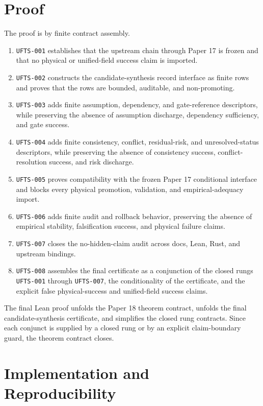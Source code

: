\documentclass{article}
\begin{document}
\section{Proof}

The proof is by finite contract assembly.

\begin{enumerate}
\item \texttt{UFTS-001} establishes that the upstream chain through Paper 17 is
frozen and that no physical or unified-field success claim is imported.
\item \texttt{UFTS-002} constructs the candidate-synthesis record interface as
finite rows and proves that the rows are bounded, auditable, and
non-promoting.
\item \texttt{UFTS-003} adds finite assumption, dependency, and gate-reference
descriptors, while preserving the absence of assumption discharge, dependency
sufficiency, and gate success.
\item \texttt{UFTS-004} adds finite consistency, conflict, residual-risk, and
unresolved-status descriptors, while preserving the absence of consistency
success, conflict-resolution success, and risk discharge.
\item \texttt{UFTS-005} proves compatibility with the frozen Paper 17
conditional interface and blocks every physical promotion, validation, and
empirical-adequacy import.
\item \texttt{UFTS-006} adds finite audit and rollback behavior, preserving the
absence of empirical stability, falsification success, and physical failure
claims.
\item \texttt{UFTS-007} closes the no-hidden-claim audit across docs, Lean,
Rust, and upstream bindings.
\item \texttt{UFTS-008} assembles the final certificate as a conjunction of the
closed rungs \texttt{UFTS-001} through \texttt{UFTS-007}, the conditionality of
the certificate, and the explicit false physical-success and unified-field
success claims.
\end{enumerate}

The final Lean proof unfolds the Paper 18 theorem contract, unfolds the final
candidate-synthesis certificate, and simplifies the closed rung contracts.
Since each conjunct is supplied by a closed rung or by an explicit claim-boundary
guard, the theorem contract closes.

\section{Implementation and Reproducibility}
\end{document}
